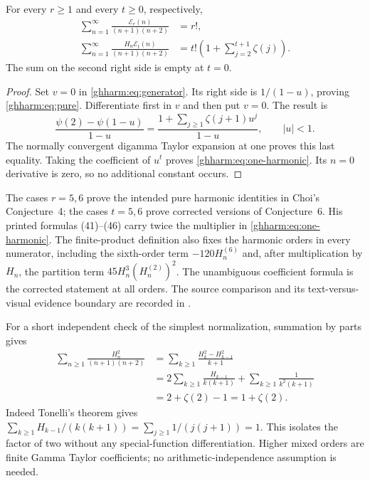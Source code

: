 \begin{corollary}
\label{ghharm:cor:two-families}
For every $r\ge1$ and every $t\ge0$, respectively,
\begin{align}
 \sum_{n=1}^{\infty}\frac{\mathcal E_r(n)}{(n+1)(n+2)}
   &=r!,\label{ghharm:eq:pure}\\
 \sum_{n=1}^{\infty}\frac{H_n\mathcal E_t(n)}{(n+1)(n+2)}
   &=t!\left(1+\sum_{j=2}^{t+1}\zeta(j)\right).
   \label{ghharm:eq:one-harmonic}
\end{align}
The sum on the second right side is empty at $t=0$.
\end{corollary}
\begin{proof}
Set $v=0$ in \eqref{ghharm:eq:generator}. Its right side is
$1/(1-u)$, proving \eqref{ghharm:eq:pure}.
Differentiate first in $v$ and then put $v=0$. The result is
\[
 \frac{\psi(2)-\psi(1-u)}{1-u}
   =\frac{1+\sum_{j\ge1}\zeta(j+1)u^j}{1-u},\qquad |u|<1.
\]
The normally convergent digamma Taylor expansion at one proves this
last equality. Taking the coefficient of $u^t$ proves
\eqref{ghharm:eq:one-harmonic}. Its $n=0$ derivative is zero, so no
additional constant occurs.
\end{proof}

The cases $r=5,6$ prove the intended pure harmonic identities in
Choi's Conjecture~4; the cases $t=5,6$ prove corrected versions of
Conjecture~6. His printed formulas (41)--(46) carry twice the
multiplier in \eqref{ghharm:eq:one-harmonic}. The finite-product
definition also fixes the harmonic orders in every numerator, including
the sixth-order term $-120H_n^{(6)}$ and, after multiplication by
$H_n$, the partition term $45H_n^3(H_n^{(2)})^2$.
The unambiguous coefficient formula is the corrected statement at all
orders. The source comparison and its text-versus-visual evidence
boundary are recorded in .

For a short independent check of the simplest normalization, summation
by parts gives
\begin{align*}
 \sum_{n\ge1}\frac{H_n^2}{(n+1)(n+2)}
 &=\sum_{k\ge1}\frac{H_k^2-H_{k-1}^2}{k+1}\\
 &=2\sum_{k\ge1}\frac{H_{k-1}}{k(k+1)}
       +\sum_{k\ge1}\frac1{k^2(k+1)}\\
 &=2+\zeta(2)-1=1+\zeta(2).
\end{align*}
Indeed Tonelli's theorem gives
$\sum_{k\ge1}H_{k-1}/(k(k+1))
=\sum_{j\ge1}1/(j(j+1))=1$.
This isolates the factor of two without any special-function
differentiation. Higher mixed orders are finite Gamma Taylor
coefficients; no arithmetic-independence assumption is needed.
